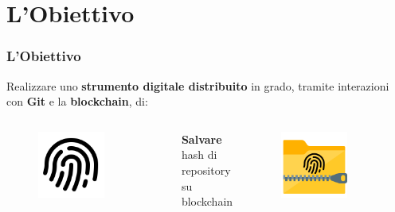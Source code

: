 \documentclass{beamer}
\begin{document}
\section{L'Obiettivo}
\begin{frame}
	\frametitle{L'Obiettivo}
	Realizzare uno \textbf{strumento digitale distribuito} in grado, tramite
	interazioni con \textbf{Git} e la \textbf{blockchain}, di:
	\medskip
	\begin{columns}
		\centering
		\begin{figure}
			\includegraphics[width=0.7\textwidth]{figures/fingerprint.png}
		\end{figure}
		\textbf{Salvare} hash di
		repository su
		blockchain
		\centering
		\begin{figure}
			\includegraphics[width=0.7\textwidth]{figures/folder_zip.png}

\end{figure}
\end{columns}
\end{frame}
\end{document}
